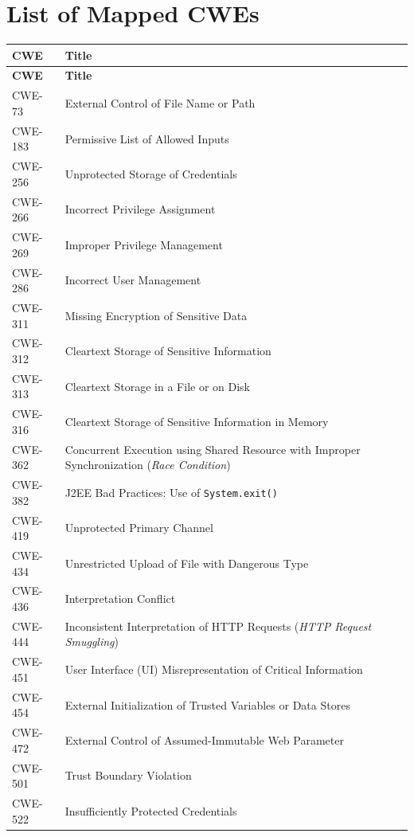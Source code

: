 \documentclass[11pt]{article}
\begin{document}
\newpage
\section{List of Mapped CWEs}
\renewcommand{\arraystretch}{1.1}
\begin{longtable}{@{}p{2.4cm}p{12.0cm}@{}}
\toprule
\textbf{CWE} & \textbf{Title} \\
\midrule
\endfirsthead
\toprule
\textbf{CWE} & \textbf{Title} \\
\midrule
\endhead
\bottomrule
\endfoot

CWE-73   & External Control of File Name or Path \\
CWE-183  & Permissive List of Allowed Inputs \\
CWE-256  & Unprotected Storage of Credentials \\
CWE-266  & Incorrect Privilege Assignment \\
CWE-269  & Improper Privilege Management \\
CWE-286  & Incorrect User Management \\
CWE-311  & Missing Encryption of Sensitive Data \\
CWE-312  & Cleartext Storage of Sensitive Information \\
CWE-313  & Cleartext Storage in a File or on Disk \\
CWE-316  & Cleartext Storage of Sensitive Information in Memory \\
CWE-362  & Concurrent Execution using Shared Resource with Improper Synchronization (\textit{Race Condition}) \\
CWE-382  & J2EE Bad Practices: Use of \texttt{System.exit()} \\
CWE-419  & Unprotected Primary Channel \\
CWE-434  & Unrestricted Upload of File with Dangerous Type \\
CWE-436  & Interpretation Conflict \\
CWE-444  & Inconsistent Interpretation of HTTP Requests (\textit{HTTP Request Smuggling}) \\
CWE-451  & User Interface (UI) Misrepresentation of Critical Information \\
CWE-454  & External Initialization of Trusted Variables or Data Stores \\
CWE-472  & External Control of Assumed-Immutable Web Parameter \\
CWE-501  & Trust Boundary Violation \\
CWE-522  & Insufficiently Protected Credentials \\

\end{longtable}
\end{document}

